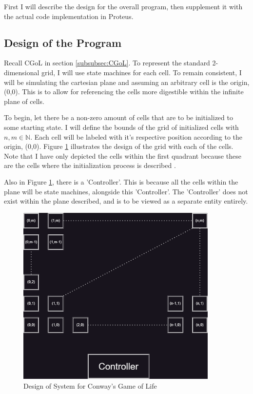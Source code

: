 First I will describe the design for the overall program, then supplement it with the actual code implementation in Proteus.

\subsection{Design of the Program}

Recall CGoL in section \ref{subsubsec:CGoL}.
To represent the standard 2-dimensional grid, I will use state machines for each cell.
To remain consistent, I will be simulating the cartesian plane and assuming an arbitrary cell is the origin, (0,0).
This is to allow for referencing the cells more digestible within the infinite plane of cells.

To begin, let there be a non-zero amount of cells that are to be initialized to some starting state.
I will define the bounds of the grid of initialized cells with $n,m \in \mathbb{N}$.
Each cell will be labeled with it's respective position according to the origin, (0,0).
Figure \ref{fig:ProteusCGoLDesign} illustrates the design of the grid with each of the cells.
Note that I have only depicted the cells within the first quadrant because these are the cells where the initialization process is described \cite{CartesianPlane}.

Also in Figure \ref{fig:ProteusCGoLDesign}, there is a 'Controller'.
This is because all the cells within the plane will be state machines, alongside this 'Controller'.
The 'Controller' does not exist within the plane described, and is to be viewed as a separate entity entirely.

\begin{figure}[htb]
    \centering
    \includegraphics[width=10cm]{Images/CGoLDesign.png}
       \caption{Design of System for Conway's Game of Life}
           \label{fig:ProteusCGoLDesign}
\end{figure}

